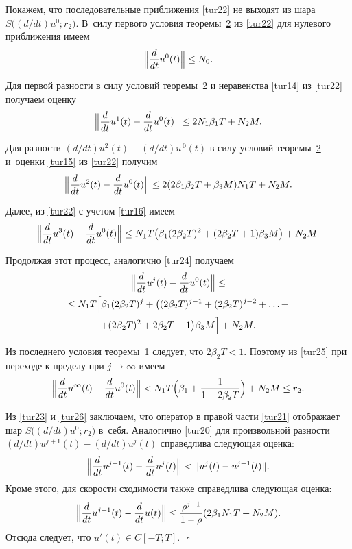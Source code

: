Покажем, что последовательные приближения \eqref{tur22} не выходят из шара $S \bigl( ({d}/{d t}) u^{ 0} ; r_2 \bigr)$. 
В~силу первого условия теоремы~\hyperlink{yuld:th2}{2} из \eqref{tur22} для нулевого приближения имеем 
\begin {equation}\label{tur23}
\Bigl\|  \dfrac{d}{d t} u^{ 0} (t) \Bigr\| \le N_{0} .	
\end{equation}

Для первой разности в силу условий теоремы~\hyperlink{yuld:th2}{2} и неравенства \eqref{tur14} 
из \eqref{tur22} получаем оценку 
$$
\Bigl\|  \frac{d}{d t} u^{1} (t)- \frac{d}{d t} u^{0} (t) \Bigr\| \le 2  N_1  \beta_1  T+N_2  M .
$$

Для разности $ ({d}/{d t}) u^{2} (t)- ({d}/{d t}) u^{\, 0} (t)$ в силу условий теоремы~\hyperlink{yuld:th2}{2} и~оценки \eqref{tur15} из \eqref{tur22}  получим 
$$
\Bigl\|  \frac{d}{d t} u^{2} (t)- \frac{d}{d t} u^{0} (t) \Bigr\|
\le 2  (2  \beta_1  \beta_2  T+\beta_3  M)  N_1  T+N_2  M .
$$

Далее, из \eqref{tur22} с учетом \eqref{tur16} имеем
\begin{equation}
\Bigl\|  \frac{d}{d t} u^{3} (t)- \frac{d}{d t} u^{0} (t) \Bigr\|
\le N_1  T  \bigl( \beta_1  (2  \beta_2 T)^2+(2  \beta_2  T+1)  \beta_3  M \bigr)+N_2  M.
\label{tur24}
\end{equation}

Продолжая этот процесс, аналогично \eqref{tur24} получаем
\begin{multline}
\Bigl\|  \frac{d}{d t} u^{j} (t)- \frac{d}{d t} u^{0} (t) \Bigr\| \le \\ 
\le N_1  T  \Bigl[ \beta_1 (2  \beta_2  T)^j+
\bigl( (2   \beta_2   T)^{j-1}+(2   \beta_2  T)^{j-2}+ \ldots + \\ 
+(2  \beta_2  T)^2+2  \beta_2  T+1 \bigr)  \beta_3   M \Bigr]+N_2  M .
\label{tur25}
\end{multline}

Из последнего условия теоремы~\hyperlink{yuld:th1}{1} следует, что $2  \beta_2  T<1$. 
Поэтому из \eqref{tur25} при переходе к пределу при $j \to \infty$  имеем
\begin{equation}\label{tur26}
\Bigl\|  \frac{d}{d t} u^{\infty} (t)- \frac{d}{d t} u^{ 0} (t) \Bigr\|<  N_{1} T \Bigl(\beta_1+\frac{1}{1-2  \beta_2  T} \Bigr) +N_{ 2}  M \le r_2 .
\end{equation}

Из \eqref{tur23} и \eqref{tur26} заключаем, что оператор в правой части \eqref{tur21} отображает шар 
$S \bigl(({d}/{d t})  u^{ 0} ; r_2 \bigr)$ в~себя. 
Аналогично \eqref{tur20} для произвольной разности $({d}/{d t}) u^{ j+1} (t)- ({d}/{d t}) u^{ j} (t)$  справедлива следующая оценка: 
$$\Bigl\|  \frac{d}{d t} u^{ j+1} (t)- \frac{d}{d t} u^{ j} (t) \Bigr\|< \|  u^{ j} (t)- u^{  j-1} (t) \|.$$  
Кроме этого, для скорости сходимости также справедлива следующая оценка:
$$
\Bigl\| 
\frac{d}{d t} u^{ j+1} (t)- \frac{d}{d t} u (t) \Bigr\|  \le \frac{\rho^{ j+1}}{1-\rho}  (2 \beta_1  N_1  T+N_2  M ) .
$$
Отсюда следует, что $ u' (t) \in C [-T ;  T]$.~$~\square$
  

